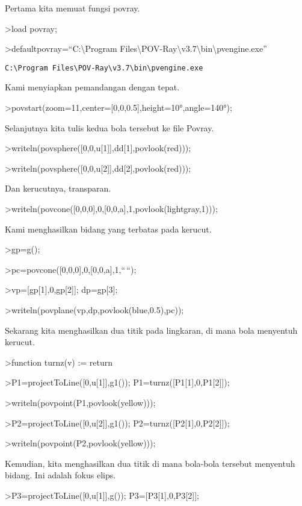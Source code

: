 \documentclass[
]{book}
\begin{document}
Pertama kita memuat fungsi povray.

\textgreater load povray;

\textgreater defaultpovray=``C:\textbackslash Program Files\textbackslash POV-Ray\textbackslash v3.7\textbackslash bin\textbackslash pvengine.exe''

\begin{verbatim}
C:\Program Files\POV-Ray\v3.7\bin\pvengine.exe
\end{verbatim}

Kami menyiapkan pemandangan dengan tepat.

\textgreater povstart(zoom=11,center={[}0,0,0.5{]},height=10°,angle=140°);

Selanjutnya kita tulis kedua bola tersebut ke file Povray.

\textgreater writeln(povsphere({[}0,0,u{[}1{]}{]},dd{[}1{]},povlook(red)));

\textgreater writeln(povsphere({[}0,0,u{[}2{]}{]},dd{[}2{]},povlook(red)));

Dan kerucutnya, transparan.

\textgreater writeln(povcone({[}0,0,0{]},0,{[}0,0,a{]},1,povlook(lightgray,1)));

Kami menghasilkan bidang yang terbatas pada kerucut.

\textgreater gp=g();

\textgreater pc=povcone({[}0,0,0{]},0,{[}0,0,a{]},1,``\,``);

\textgreater vp={[}gp{[}1{]},0,gp{[}2{]}{]}; dp=gp{[}3{]};

\textgreater writeln(povplane(vp,dp,povlook(blue,0.5),pc));

Sekarang kita menghasilkan dua titik pada lingkaran, di mana bola menyentuh kerucut.

\textgreater function turnz(v) := return

\textgreater P1=projectToLine({[}0,u{[}1{]}{]},g1()); P1=turnz({[}P1{[}1{]},0,P1{[}2{]}{]});

\textgreater writeln(povpoint(P1,povlook(yellow)));

\textgreater P2=projectToLine({[}0,u{[}2{]}{]},g1()); P2=turnz({[}P2{[}1{]},0,P2{[}2{]}{]});

\textgreater writeln(povpoint(P2,povlook(yellow)));

Kemudian, kita menghasilkan dua titik di mana bola-bola tersebut menyentuh bidang. Ini adalah fokus elips.

\textgreater P3=projectToLine({[}0,u{[}1{]}{]},g()); P3={[}P3{[}1{]},0,P3{[}2{]}{]};
\end{document}
